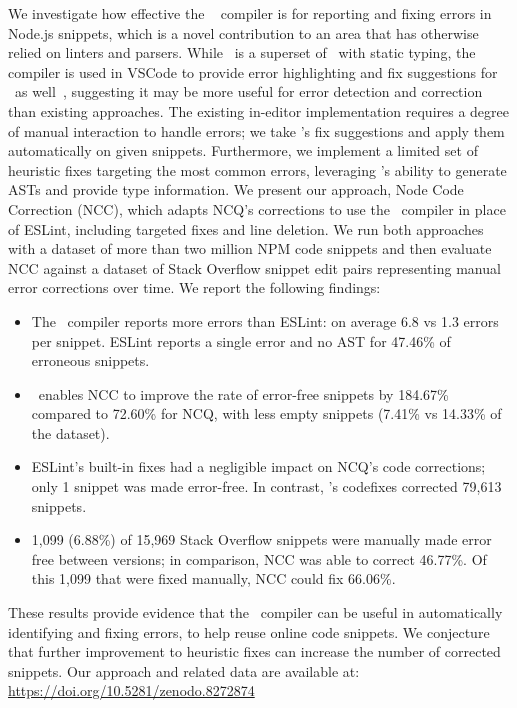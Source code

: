 \documentclass[conference]{IEEEtran}
\begin{document}
We investigate how effective the \ts~\cite{typescript} compiler is for reporting and fixing errors in Node.js snippets, which is a novel contribution to an area that has otherwise relied on linters and parsers. While \ts\ is a superset of \js\ with static typing, the compiler is used in VSCode to provide error highlighting and fix suggestions for \js\ as well~\cite{vscodets}, suggesting it may be more useful for error detection and correction than existing approaches. The existing in-editor implementation requires a degree of manual interaction to handle errors; we take \ts{}'s fix suggestions and apply them automatically on given snippets. Furthermore, we implement a limited set of heuristic fixes targeting the most common errors, leveraging \ts{}'s ability to generate ASTs and provide type information. We present our approach, Node Code Correction (NCC), which adapts NCQ's corrections to use the \ts\ compiler in place of ESLint, including targeted fixes and line deletion. We run both approaches with a dataset of more than two million NPM code snippets and then evaluate NCC against a dataset of Stack Overflow snippet edit pairs representing manual error corrections over time. We report the following findings:

\begin{itemize}[leftmargin=0.5cm, label={*}]
    \item The \ts\ compiler reports more errors than ESLint: on average 6.8 vs 1.3 errors per snippet. ESLint reports a single error and no AST for 47.46\% of erroneous snippets.
    \item \ts\ enables NCC to improve the rate of error-free snippets by 184.67\% compared to 72.60\% for NCQ, with less empty snippets (7.41\% vs 14.33\% of the dataset).
    \item ESLint's built-in fixes had a negligible impact on NCQ's code corrections; only 1 snippet was made error-free. In contrast, \ts{}'s codefixes corrected 79,613 snippets.
    \item 1,099 (6.88\%) of 15,969 Stack Overflow snippets were manually made error free between versions; in comparison, NCC was able to correct 46.77\%. Of this 1,099 that were fixed manually, NCC could fix 66.06\%.
\end{itemize}

\noindent
These results provide evidence that the \ts\ compiler can be useful in automatically identifying and fixing errors, to help reuse online code snippets. We conjecture that further improvement to heuristic fixes can increase the number of corrected snippets. Our approach and related data are available at: \url{https://doi.org/10.5281/zenodo.8272874}
\end{document}
